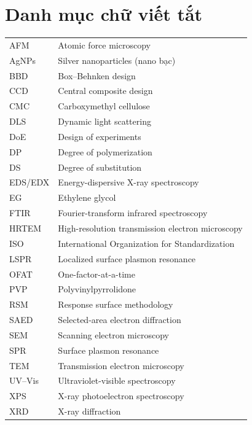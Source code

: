 \documentclass[13pt,a4paper,openright]{extreport}
\begin{document}
\chapter*{Danh mục chữ viết tắt}
\begin{longtable}{@{}p{}p{}@{}}
  AFM & Atomic force microscopy \\
  AgNPs & Silver nanoparticles (nano bạc) \\
  BBD & Box--Behnken design \\
  CCD & Central composite design \\
  CMC & Carboxymethyl cellulose \\
  DLS & Dynamic light scattering \\
  DoE & Design of experiments \\
  DP & Degree of polymerization \\
  DS & Degree of substitution \\
  EDS/EDX & Energy-dispersive X-ray spectroscopy \\
  EG & Ethylene glycol \\
  FTIR & Fourier-transform infrared spectroscopy \\
  HRTEM & High-resolution transmission electron microscopy \\
  ISO & International Organization for Standardization \\
  LSPR & Localized surface plasmon resonance \\
  OFAT & One-factor-at-a-time \\
  PVP & Polyvinylpyrrolidone \\
  RSM & Response surface methodology \\
  SAED & Selected-area electron diffraction \\
  SEM & Scanning electron microscopy \\
  SPR & Surface plasmon resonance \\
  TEM & Transmission electron microscopy \\
  UV--Vis & Ultraviolet-visible spectroscopy \\
  XPS & X-ray photoelectron spectroscopy \\
  XRD & X-ray diffraction
\end{longtable}

\tableofcontents
\clearpage
\renewcommand{\listfigurename}{Danh sách hình}
\listoffigures
{}
\clearpage
\renewcommand{\listtablename}{Danh sách bảng}
\listoftables
{}
\clearpage







\printbibliography[heading=bibintoc,title={Tài liệu tham khảo}]

\appendix

\end{document}
